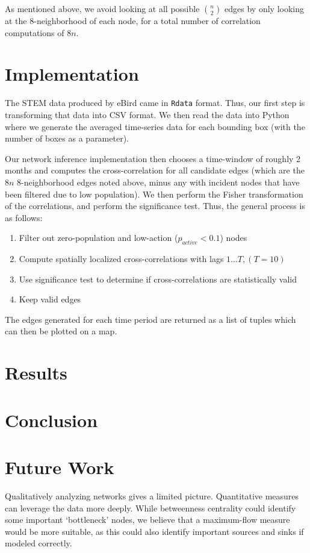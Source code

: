 \documentclass{article} %
\begin{document}
As mentioned above, we avoid looking at all possible $n \choose 2$ edges by only looking at the 8-neighborhood of each node, for a total number of correlation computations of $8n$.

\section{Implementation}
The STEM data produced by eBird came in \texttt{Rdata} format. Thus, our first step is transforming that data into CSV format. We then read the data into Python where we generate the averaged time-series data for each bounding box (with the number of boxes as a parameter). 

Our network inference implementation then chooses a time-window of roughly 2 months and computes the cross-correlation for all candidate edges (which are the $8n$ 8-neighborhood edges noted above, minus any with incident nodes that have been filtered due to low population). We then perform the Fisher transformation of the correlations, and perform the significance test. Thus, the general process is as follows:

\begin{enumerate}
\item Filter out zero-population and low-action ($p_{active} < 0.1$) nodes
\item Compute spatially localized cross-correlations with lags $1\dots T, (T=10)$
\item Use significance test to determine if cross-correlations are statistically valid
\item Keep valid edges
\end{enumerate}

The edges generated for each time period are returned as a list of tuples which can then be plotted on a map.

\section{Results}

\section{Conclusion}

\section{Future Work}
Qualitatively analyzing networks gives a limited picture. Quantitative measures can leverage the data more deeply. While betweenness centrality could identify some important `bottleneck' nodes, we believe that a maximum-flow measure would be more suitable, as this could also identify important sources and sinks if modeled correctly.
\end{document}
